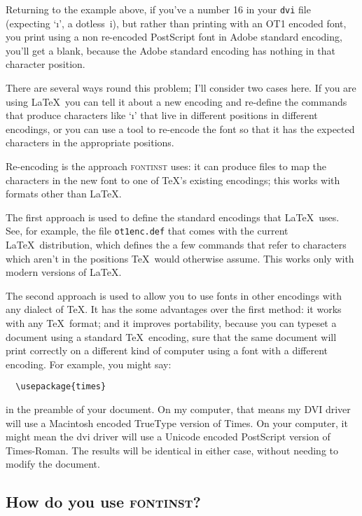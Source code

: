 \documentclass[a4paper]{ltxguide}
\newcommand{\PS}{Post\-Script\xspace}
\newcommand{\TT}{True\-Type\xspace}
\newcommand*{\setfilename}[1]{\texttt{#1}}
\newcommand*{\setpackagename}[1]{\textsc{#1}}
\newcommand{\fontinst}{\setpackagename{font\-inst}\xspace}
\newcommand{\dvi}{\setfilename{dvi}\xspace}
\begin{document}
Returning to the example above, if you've a number 16 in your \dvi
file (expecting `\i', a dotless~i), but rather than printing
with an OT1 encoded font, you print using a non re-encoded \PS
font in Adobe standard encoding, you'll get a blank, because the
Adobe standard encoding has nothing in that character position.

There are several ways round this problem; I'll consider two cases
here.  If you are using \LaTeX\ you can tell it about a new
encoding and re-define the commands that produce characters like
`\i' that live in different positions in different encodings, or
you can use a tool to re-encode the font so that it has the
expected characters in the appropriate positions.

Re-encoding is the approach \fontinst uses: it can produce files
to map the characters in the new font to one of \TeX's existing
encodings; this works with formats other than \LaTeX.

The first approach is used to define the standard encodings that
\LaTeX\ uses.  See, for example, the file \texttt{ot1enc.def} that
comes with the current \LaTeX\ distribution, which defines the a
few commands that refer to characters which aren't in the
positions \TeX\ would otherwise assume.  This works only with
modern versions of \LaTeX.

The second approach is used to allow you to use fonts in other
encodings with any dialect of \TeX. It has the some advantages
over the first method: it works with any \TeX\ format; and it
improves portability, because you can typeset a document using a
standard \TeX\ encoding, sure that the same document will print
correctly on a different kind of computer using a font with a
different encoding.  For example, you might say:
\begin{verbatim}
  \usepackage{times}
\end{verbatim}
in the preamble of your document.  On my computer, that means my
DVI driver will use a Macintosh encoded \TT version of Times.  On
your computer, it might mean the dvi driver will use a Unicode
encoded \PS version of Times-Roman.  The results will be identical
in either case, without needing to modify the document.

\subsection{How do you use \fontinst?}
\end{document}
